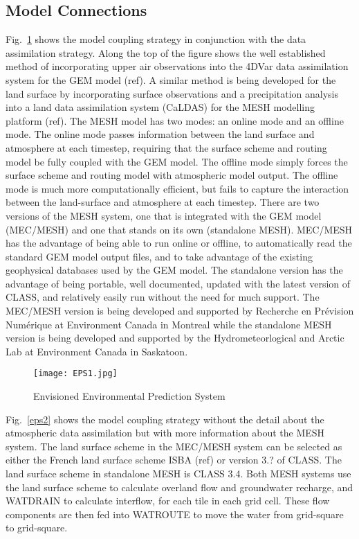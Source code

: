 \documentclass[hess]{copernicus}
\begin{document}
\subsection{Model Connections} %
Fig.~\ref{eps1} shows the model coupling strategy in conjunction with the data assimilation strategy. Along the top of the figure shows the well established method of incorporating upper air observations into the 4DVar data assimilation system for the GEM model (ref). A similar method is being developed for the land surface by incorporating surface observations and a precipitation analysis into a land data assimilation system (CaLDAS) for the MESH modelling platform (ref). The MESH model has two modes: an online mode and an offline mode. The online mode passes information between the land surface and atmosphere at each timestep, requiring that the surface scheme and routing model be fully coupled with the GEM model. The offline mode simply forces the surface scheme and routing model with atmospheric model output. The offline mode is much more computationally efficient, but fails to capture the interaction between the land-surface and atmosphere at each timestep. There are two versions of the MESH system, one that is integrated with the GEM model (MEC/MESH) and one that stands on its own (standalone MESH). MEC/MESH has the advantage of being able to run online or offline, to automatically read the standard GEM model output files, and to take advantage of the existing geophysical databases used by the GEM model. The standalone version has the advantage of being portable, well documented, updated with the latest version of CLASS, and relatively easily run without the need for much support. The MEC/MESH version is being developed and supported by Recherche en  Pr\'{e}vision Num\'{e}rique at Environment Canada in Montreal while the standalone MESH version is being developed and supported by the Hydrometeorlogical and Arctic Lab at Environment Canada in Saskatoon.

\begin{figure}[h!]
\vspace*{2mm}
\begin{center}
\texttt{[image: EPS1.jpg]}
\end{center}
\caption{Envisioned Environmental Prediction System}
\label{eps1}
\end{figure}

Fig.~\ref{eps2} shows the model coupling strategy without the detail about the atmospheric data assimilation but with more information about the MESH system. The land surface scheme in the MEC/MESH system can be selected as either the French land surface scheme ISBA (ref) or version 3.? of CLASS. The land surface scheme in standalone MESH is CLASS 3.4. Both MESH systems use the land surface scheme to calculate overland flow and groundwater recharge, and WATDRAIN to calculate interflow, for each tile in each grid cell. These flow components are then fed into WATROUTE to move the water from grid-square to grid-square.
\end{document}
